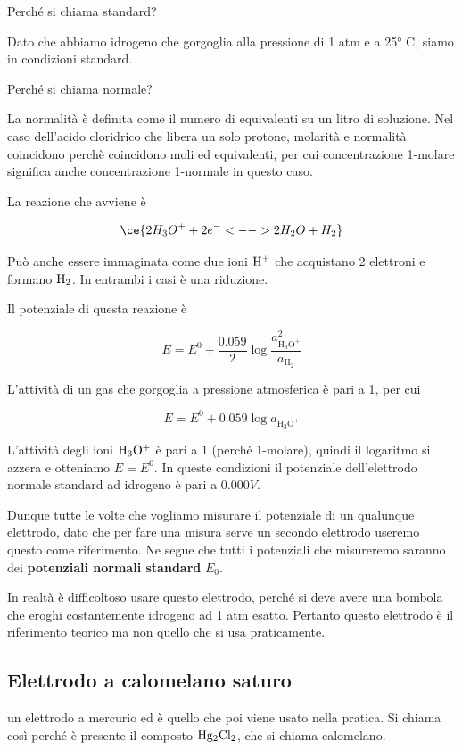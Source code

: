 \vspace{0.2cm}Perché si chiama standard?

Dato che abbiamo idrogeno che gorgoglia alla pressione di 1 atm e a 25° C, siamo in condizioni standard.

Perché si chiama normale?

La normalità è definita come il numero di equivalenti su un litro di soluzione. Nel caso dell'acido cloridrico che libera un solo protone, molarità e normalità coincidono perchè coincidono moli ed equivalenti, per cui concentrazione 1-molare significa anche concentrazione 1-normale in questo caso.

La reazione che avviene è

$$\ce{2H_3O^+ + 2e^- <--> 2H_2O + H_2}$$

Può anche essere immaginata come due ioni $\rm H^+$ che acquistano 2 elettroni e formano $\rm H_2$. In entrambi i casi è una riduzione.

Il potenziale di questa reazione è

$$E = E^0 + \frac{0.059}{2} \log \frac{a^2_{\text{H}_3\text{O}^+}}{a_{\text{H}_2}}$$

L'attività di un gas che gorgoglia a pressione atmosferica è pari a 1, per cui

$$E = E^0 + 0.059 \log a_{\text{H}_3\text{O}^+}$$

L'attività degli ioni $\rm H_3O^+$ è pari a 1 (perché 1-molare), quindi il logaritmo si azzera e otteniamo $E=E^0$. In queste condizioni il potenziale dell'elettrodo normale standard ad idrogeno è pari a $0.000 V$.

Dunque tutte le volte che vogliamo misurare il potenziale di un qualunque elettrodo, dato che per fare una misura serve un secondo elettrodo useremo questo come riferimento. Ne segue che tutti i potenziali che misureremo saranno dei \textbf{potenziali normali standard} $E_0$.

In realtà è difficoltoso usare questo elettrodo, perché si deve avere una bombola che eroghi costantemente idrogeno ad 1 atm esatto. Pertanto questo elettrodo è il riferimento teorico ma non quello che si usa praticamente.
\subsection{Elettrodo a calomelano saturo}
\E un elettrodo a mercurio ed è quello che poi viene usato nella pratica. Si chiama così perché è presente il composto $\rm Hg_2Cl_2$, che si chiama calomelano.

